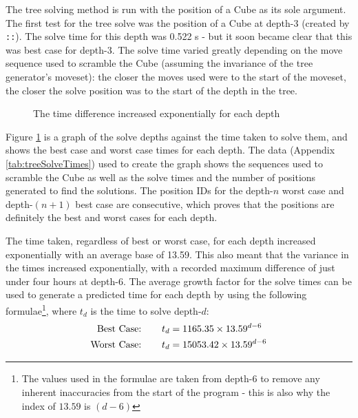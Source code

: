 \documentclass{report}
\newcommand{\movesequence}[1]{\uppercase{\texttt{:\formatmoves{#1}:}}}
\newcommand{\depth}[1]{depth-#1}
\begin{document}
	The tree solving method is run with the position of a Cube as its sole argument. The first test for the tree solve was the position of a Cube at \depth{3} (created by \movesequence{l'd'u@}). The solve time for this depth was 0.522 \si{\second} - but it soon became clear that this was best case for \depth{3}. The solve time varied greatly depending on the move sequence used to scramble the Cube (assuming the invariance of the tree generator's moveset): the closer the moves used were to the start of the moveset, the closer the solve position was to the start of the depth in the tree.
    
   	\begin{figure}[H]
    	\centering
   		\caption{The time difference increased exponentially for each depth}
   		\label{fig:treeSolveGraph}
    \end{figure}
    
    Figure \ref{fig:treeSolveGraph} is a graph of the solve depths against the time taken to solve them, and shows the best case and worst case times for each depth. The data (Appendix \ref{tab:treeSolveTimes}) used to create the graph shows the sequences used to scramble the Cube as well as the solve times and the number of positions generated to find the solutions. The position IDs for the \depth{$n$} worst case and \depth{$(n+1)$} best case are consecutive, which proves that the positions are definitely the best and worst cases for each depth.
    
    The time taken, regardless of best or worst case, for each depth increased exponentially with an average base of 13.59. This also meant that the variance in the times increased exponentially, with a recorded maximum difference of just under four hours at \depth{6}. The average growth factor for the solve times can be used to generate a predicted time for each depth by using the following formulae\footnote{The values used in the formulae are taken from \depth{6} to remove any inherent inaccuracies from the start of the program - this is also why the index of $13.59$ is $(d-6)$}, where $t_d$ is the time to solve \depth{$d$}:
   	\begin{align*}
   	\text{Best Case:}\hspace{7.5mm} 	&	t_d = 1165.35 \times 13.59^{d-6} \\
	\text{Worst Case:}\hspace{7.5mm}	&	t_d = 15053.42 \times 13.59^{d-6}
   	\end{align*}
   	
\end{document}
